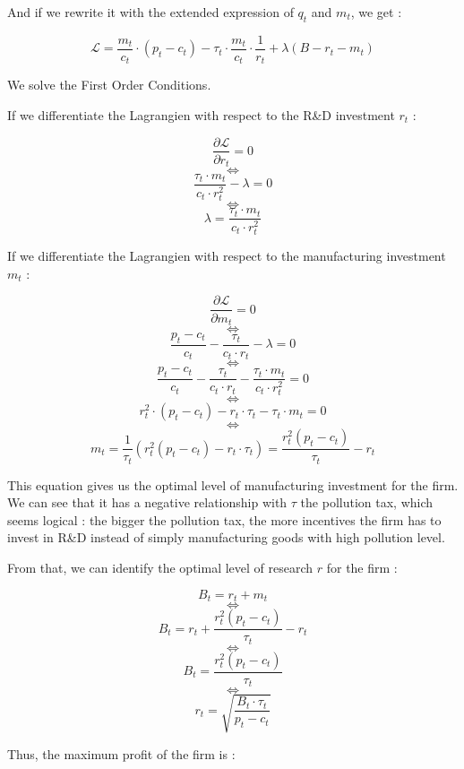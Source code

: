 \documentclass{article}
\begin{document}
And if we rewrite it with the extended expression of $q_{t}$ and $m_{t}$, we get : 

\begin{equation*}
    \mathcal{L} = \frac{m_{t}}{c_{t}}\cdot\left(p_{t}-c_{t}\right)-\tau_{t}\cdot \frac{m_{t}}{c_{t}}\cdot \frac{1}{r_{t}}+\lambda\left(B-r_{t}-m_{t}\right)
\end{equation*}

We solve the First Order Conditions.

If we differentiate the Lagrangien with respect to the R\&D investment $r_{t}$ :

$$\frac{\partial \mathcal{L}}{\partial r_{t}}=0$$
$$\iff$$
$$\frac{\tau_{t}\cdot m_{t}}{c_{t}\cdot r^{2}_{t}}-\lambda=0$$
$$\iff$$
$$\lambda=\frac{\tau_{t}\cdot m_{t}}{c_{t}\cdot r^{2}_{t}}$$

If we differentiate the Lagrangien with respect to the manufacturing investment $m_{t}$ :

$$\frac{\partial \mathcal{L}}{\partial m_{t}}=0$$
$$\iff$$
$$\frac{p_{t}-c_{t}}{c_{t}}-\frac{\tau_{t}}{c_{t}\cdot r_{t}}-\lambda=0$$
$$\iff$$
$$\frac{p_{t}-c_{t}}{c_{t}}-\frac{\tau_{t}}{c_{t}\cdot r_{t}}-\frac{\tau_{t}\cdot m_{t}}{c_{t}\cdot r^{2}_{t}}=0$$
$$\iff$$
$$r^{2}_{t}\cdot(p_{t}-c_{t})-r_{t}\cdot \tau_{t}-\tau_{t}\cdot m_{t}=0$$
$$\iff$$
\begin{equation}
    m_{t}=\frac{1}{\tau_{t}}\left(r_{t}^{2}(p_{t}-c_{t})-r_{t}\cdot \tau_{t}\right)=\frac{r_{t}^{2}\left(p_{t}-c_{t}\right)}{\tau_{t}}-r_{t}
\end{equation}

This equation gives us the optimal level of manufacturing investment for the firm. We can see that it has a negative relationship with $\tau$ the pollution tax, which seems logical : the bigger the pollution tax, the more incentives the firm has to invest in R\&D instead of simply manufacturing goods with high pollution level. 

From that, we can identify the optimal level of research $r$ for the firm :

$$B_{t}=r_{t}+m_{t}$$
$$\iff$$
$$B_{t}=r_{t}+\frac{r_{t}^{2}\left(p_{t}-c_{t}\right)}{\tau_{t}}-r_{t}$$
$$\iff$$
$$B_{t}=\frac{r_{t}^{2}\left(p_{t}-c_{t}\right)}{\tau_{t}}$$
$$\iff$$
\begin{equation}
    r_{t}=\sqrt{\frac{B_{t}\cdot \tau_{t}}{p_{t}-c_{t}}}
\end{equation}


Thus, the maximum profit of the firm is : 
\end{document}
